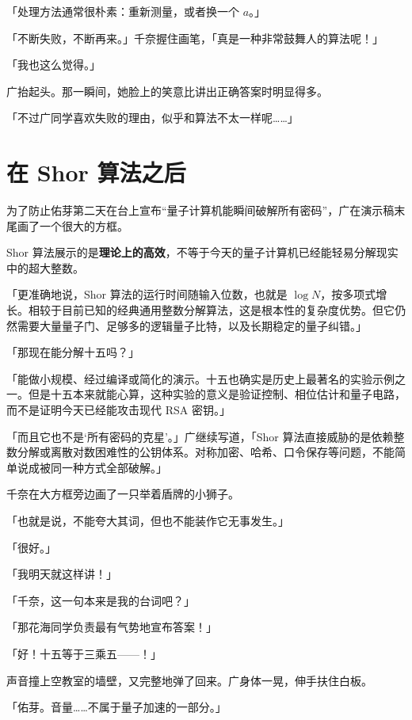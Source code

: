 「处理方法通常很朴素：重新测量，或者换一个 $a$。」

「不断失败，不断再来。」千奈握住画笔，「真是一种非常鼓舞人的算法呢！」

「我也这么觉得。」

广抬起头。那一瞬间，她脸上的笑意比讲出正确答案时明显得多。

「不过广同学喜欢失败的理由，似乎和算法不太一样呢……」

\section{在 Shor 算法之后}

为了防止佑芽第二天在台上宣布“量子计算机能瞬间破解所有密码”，广在演示稿末尾画了一个很大的方框。

\begin{center}
\setlength{\fboxsep}{8pt}%
\colorbox{codebg}{%
\parbox{0.88\linewidth}{%
Shor 算法展示的是\textbf{理论上的高效}，不等于今天的量子计算机已经能轻易分解现实中的超大整数。}}
\end{center}

「更准确地说，Shor 算法的运行时间随输入位数，也就是 $\log N$，按多项式增长。相较于目前已知的经典通用整数分解算法，这是根本性的复杂度优势。但它仍然需要大量量子门、足够多的逻辑量子比特，以及长期稳定的量子纠错。」

「那现在能分解十五吗？」

「能做小规模、经过编译或简化的演示。十五也确实是历史上最著名的实验示例之一。但是十五本来就能心算，这种实验的意义是验证控制、相位估计和量子电路，而不是证明今天已经能攻击现代 RSA 密钥。」

「而且它也不是‘所有密码的克星’。」广继续写道，「Shor 算法直接威胁的是依赖整数分解或离散对数困难性的公钥体系。对称加密、哈希、口令保存等问题，不能简单说成被同一种方式全部破解。」

千奈在大方框旁边画了一只举着盾牌的小狮子。

「也就是说，不能夸大其词，但也不能装作它无事发生。」

「很好。」

「我明天就这样讲！」

「千奈，这一句本来是我的台词吧？」

「那花海同学负责最有气势地宣布答案！」

「好！十五等于三乘五——！」

声音撞上空教室的墙壁，又完整地弹了回来。广身体一晃，伸手扶住白板。

「佑芽。音量……不属于量子加速的一部分。」


